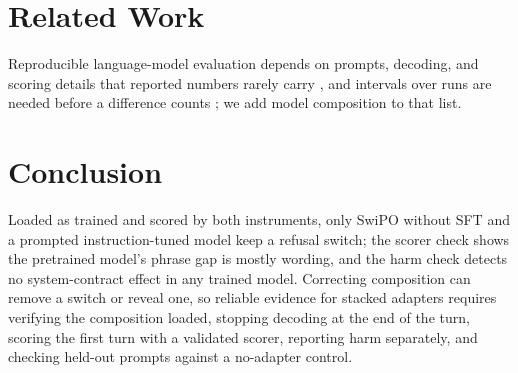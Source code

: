 \documentclass[letterpaper]{article} %
\begin{document}









\section{Related Work}

Reproducible language-model evaluation depends on prompts, decoding, and scoring details that reported numbers rarely carry \cite{biderman2024lessons}, and intervals over runs are needed before a difference counts \cite{agarwal2021precipice}; we add model composition to that list. 


\section{Conclusion}

Loaded as trained and scored by both instruments, only SwiPO without SFT and a prompted instruction-tuned model keep a refusal switch; the scorer check shows the pretrained model's phrase gap is mostly wording, and the harm check detects no system-contract effect in any trained model. Correcting composition can remove a switch or reveal one, so reliable evidence for stacked adapters requires verifying the composition loaded, stopping decoding at the end of the turn, scoring the first turn with a validated scorer, reporting harm separately, and checking held-out prompts against a no-adapter control.

{\small

}
\end{document}
